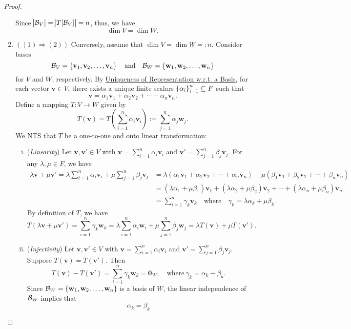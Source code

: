 \documentclass[11pt,openany]{article}
\renewcommand{\vec}[1]{\mathbf{#1}}
\begin{document}
\begin{proof}
\begin{enumerate}[]
\begin{itemize}
	\end{itemize} Since $
	\abs[1]{\mathcal{B}_V}=\abs[1]{T[\mathcal{B}_V]}=n$, thus, we have \[
	\dim V=\dim W.
	\]
	\item $((1)\Rightarrow (2))$  Conversely, assume that $\dim V=\dim W =:n.$ Consider bases \[
	\basis_V=\set{\vec{v}_1,\vec{v}_2,\dots,\vec{v}_n}\quad\text{and}\quad\basis_W=\set{\vec{w}_1,\vec{w}_2,\dots,\vec{w}_n}
	\] for $V$ and $W$, respectively. By \hyperlink{unique-wrt-basis}{Uniqueness of Representation w.r.t. a Basis}, for each vector $\vec{v}\in V$, there exists a unique finite scalars $\set{\alpha_i}_{i=1}^n\subseteq F$ such that \[
	\vec{v}=\alpha_1\vec{v}_1+\alpha_2\vec{v}_2+\cdots+\alpha_n\vec{v}_n.
	\] Define a mapping $T:V\to W$ given by \[
	T(\vec{v})=T\left(\sum_{i=1}^n\alpha_i\vec{v}_i\right):=\sum_{j=1}^n\alpha_j\vec{w}_j.
	\] We NTS that $T$ be a one-to-one and onto linear transformation: \begin{enumerate}[(i)]
		\item (\textit{Linearity}) Let $\vec{v},\vec{v}'\in V$ with $\vec{v}=\sum_{i=1}^n\alpha_i\vec{v}_i$ and $\vec{v}'=\sum_{j=1}^n\beta_j\vec{v}_j$. For any $\lambda,\mu\in F$, we have \begin{align*}
		\lambda\vec{v}+\mu\vec{v}'=\lambda\sum_{i=1}^{n}\alpha_i\vec{v}_i+\mu\sum_{j=1}^{n}\beta_j\vec{v}_j
		&=\lambda(\alpha_1\vec{v}_1+\alpha_2\vec{v}_2+\cdots+\alpha_n\vec{v}_n)+\mu(\beta_1\vec{v}_1+\beta_2\vec{v}_2+\cdots+\beta_n\vec{v}_n)\\
		&=(\lambda\alpha_1+\mu\beta_1)\vec{v}_1+(\lambda\alpha_2+\mu\beta_2)\vec{v}_2+\cdots+(\lambda\alpha_n+\mu\beta_n)\vec{v}_n\\
		&=\sum_{i=1}^{n}\gamma_k\vec{v}_k\quad\text{where}\quad\gamma_k=
		\lambda\alpha_k+\mu\beta_k.
		\end{align*} By definition of $T$, we have \[
		T(\lambda\vec{v}+\mu\vec{v}')=\sum_{i=1}^{n}\gamma_k\vec{w}_k=\lambda\sum_{i=1}^{n}\alpha_i\vec{w}_i+\mu\sum_{j=1}^{n}\beta_j\vec{w}_j=\lambda T(\vec{v})+\mu T(\vec{v}').
		\]\vspace{20pt}
		\item (\textit{Injectivity}) Let $\vec{v},\vec{v}'\in V$ with $\vec{v}=\sum_{i=1}^n\alpha_i\vec{v}_i$ and $\vec{v}'=\sum_{j=1}^n\beta_j\vec{v}_j$. Suppose $T(\vec{v})=T(\vec{v}')$. Then \[
		T(\vec{v})-T(\vec{v}')=\sum_{i=1}^{n}\gamma_k\vec{w}_k=\vec{0}_W,\quad\text{where}\ \gamma_k=\alpha_k-\beta_k.
		\] Since $\basis_W=\set{\vec{w}_1,\vec{w}_2,\dots,\vec{w}_n}$ is a basis of $W$, the linear independence of $\mathcal{B}_W$ implies that\[
		\alpha_k=\beta_k
\]
\end{enumerate}
\end{enumerate}
\end{proof}
\end{document}
